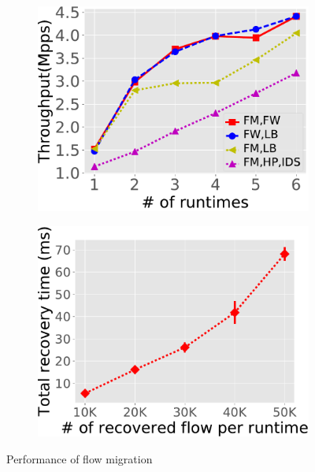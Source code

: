  \begin{figure}[!t]
 \begin{subfigure}[t]{0.49\linewidth}
		\centering
		\includegraphics[width=\columnwidth]{figure/ReplicaTP.pdf}
		\caption{}\label{fig:rep-scale}
	 \end{subfigure}\hfill
	 \begin{subfigure}[t]{0.49\linewidth}
	\centering
		\includegraphics[width=\columnwidth]{figure/Recover.pdf}
		\caption{}\label{fig:rep-recovery} \end{subfigure}
	\caption{Performance of flow migration}
\label{fig:rep-perf}
\end{figure}

